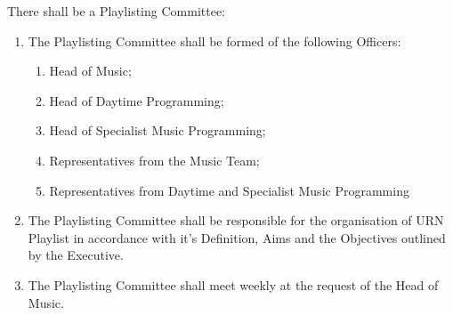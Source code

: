 \item There shall be a Playlisting Committee:
\begin{enumerate}[label*=\arabic*.]
    \item The Playlisting Committee shall be formed of the following Officers:
          \begin{enumerate}[label*=\arabic*.]
              \item Head of Music;
              \item Head of Daytime Programming;
              \item Head of Specialist Music Programming;
              \item Representatives from the Music Team;
              \item Representatives from Daytime and Specialist Music Programming
          \end{enumerate}
    \item The Playlisting Committee shall be responsible for the organisation of URN Playlist in accordance with it's Definition, Aims and the Objectives outlined by the Executive.
    \item The Playlisting Committee shall meet weekly at the request of the Head of Music.
\end{enumerate}

